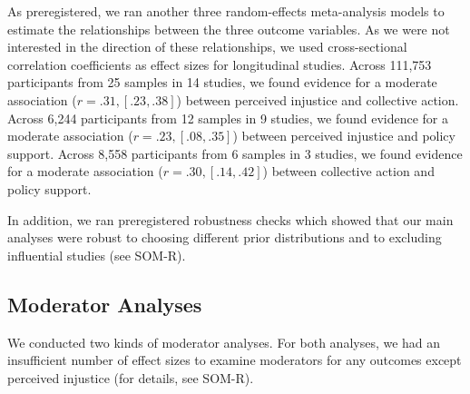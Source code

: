 \documentclass[12pt, letterpaper]{article}
\begin{document}
As preregistered, we ran another three random-effects meta-analysis
models to estimate the relationships between the three outcome
variables. As we were not interested in the direction of these
relationships, we used cross-sectional correlation coefficients as
effect sizes for longitudinal studies. Across 111,753 participants from
25 samples in 14 studies, we found evidence for a moderate association
(\(r = .31, [.23, .38]\)) between perceived injustice and collective
action. Across 6,244 participants from 12 samples in 9 studies, we found
evidence for a moderate association (\(r = .23, [.08, .35]\)) between
perceived injustice and policy support. Across 8,558 participants from 6
samples in 3 studies, we found evidence for a moderate association
(\(r = .30, [.14, .42]\)) between collective action and policy support.

In addition, we ran preregistered robustness checks which showed that
our main analyses were robust to choosing different prior distributions
and to excluding influential studies (see SOM-R).

\hypertarget{moderator-analyses}{%
\subsection{Moderator Analyses}\label{moderator-analyses}}

We conducted two kinds of moderator analyses. For both analyses, we had
an insufficient number of effect sizes to examine moderators for any
outcomes except perceived injustice (for details, see SOM-R).
\end{document}
